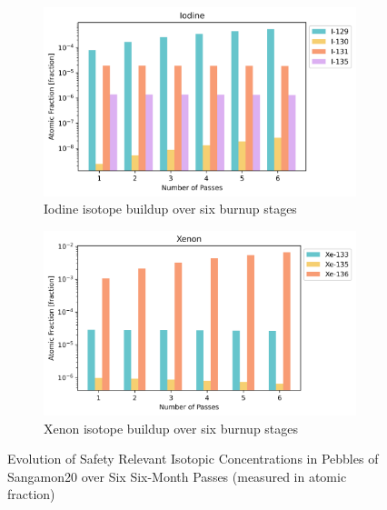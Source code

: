\begin{figure}[H]
\centering
%
\begin{subfigure}{0.8\textwidth}
  \includegraphics[width=\linewidth]{figures/compositions/iodine}
  \caption{Iodine isotope buildup over six burnup stages}
  \label{fig:i}
\end{subfigure}%

\begin{subfigure}{0.8\textwidth}
  \includegraphics[width=\linewidth]{figures/compositions/xenon}
  \caption{Xenon isotope buildup over six burnup stages}
  \label{fig:xe}
\end{subfigure}%

\caption[Evolution of Safety Relevant Isotopic Concentrations in Pebbles of Sangamon20 over Six Six-Month Passes]{Evolution of Safety Relevant Isotopic Concentrations in Pebbles of Sangamon20 over Six Six-Month Passes (measured in atomic fraction)}
\end{figure}

